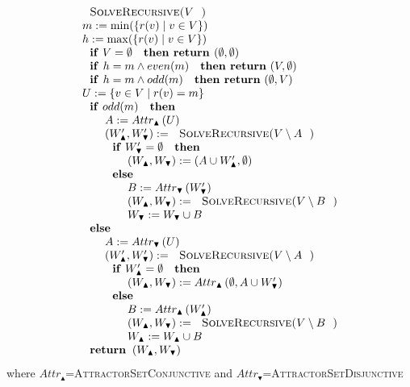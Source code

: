 \begin{equation*}
\begin{array}{l}
\text{\textsc{SolveRecursive(}}V\text{\textsc{)}} \\ 
m:=\min (\{r(v)\mid v\in V\}) \\ 
h:=\max (\{r(v)\mid v\in V\}) \\ 
\text{\textbf{if} }V=\emptyset \text{ \textbf{then return }}(\emptyset
,\emptyset ) \\ 
\text{\textbf{if }}h=m\wedge even(m)\text{ \textbf{then return} }%
(V,\emptyset ) \\ 
\text{\textbf{if }}h=m\wedge odd(m)\text{ \textbf{then return} }(\emptyset
,V) \\ 
U:=\{v\in V\mid r(v)=m\} \\ 
\text{\textbf{if} }odd(m)\text{ \textbf{then}} \\ 
\qquad A:=Attr_{\blacktriangle }\left( U\right)  \\ 
\qquad \left( W_{\blacktriangle }^{\prime },W_{\blacktriangledown }^{\prime
}\right) :=\text{\textsc{SolveRecursive(}}V\setminus A\text{)} \\ 
\qquad \text{\textbf{if} }W_{\blacktriangledown }^{\prime }=\emptyset \text{ 
\textbf{then}} \\ 
\qquad \qquad \left( W_{\blacktriangle },W_{\blacktriangledown }\right)
:=\left( A\cup W_{\blacktriangle }^{\prime },\emptyset \right)  \\ 
\qquad \text{\textbf{else}} \\ 
\qquad \qquad B:=Attr_{\blacktriangledown }\left( W_{\blacktriangledown
}^{\prime }\right)  \\ 
\qquad \qquad \left( W_{\blacktriangle },W_{\blacktriangledown }\right) :=%
\text{\textsc{SolveRecursive(}}V\setminus B\text{)} \\ 
\qquad \qquad W_{\blacktriangledown }:=W_{\blacktriangledown }\cup B \\ 
\text{\textbf{else}} \\ 
\qquad A:=Attr_{\blacktriangledown }\left( U\right)  \\ 
\qquad \left( W_{\blacktriangle }^{\prime },W_{\blacktriangledown }^{\prime
}\right) :=\text{\textsc{SolveRecursive(}}V\setminus A\text{)} \\ 
\qquad \text{\textbf{if} }W_{\blacktriangle }^{\prime }=\emptyset \text{ 
\textbf{then}} \\ 
\qquad \qquad \left( W_{\blacktriangle },W_{\blacktriangledown }\right)
:=Attr_{\blacktriangle }\left( \emptyset ,A\cup W_{\blacktriangledown
}^{\prime }\right)  \\ 
\qquad \text{\textbf{else}} \\ 
\qquad \qquad B:=Attr_{\blacktriangle }\left( W_{\blacktriangle }^{\prime
}\right)  \\ 
\qquad \qquad \left( W_{\blacktriangle },W_{\blacktriangledown }\right) :=%
\text{\textsc{SolveRecursive(}}V\setminus B\text{)} \\ 
\qquad \qquad W_{\blacktriangle }:=W_{\blacktriangle }\cup B \\ 
\text{\textbf{return }}\left( W_{\blacktriangle },W_{\blacktriangledown
}\right) 
\end{array}%
\end{equation*}%
where $Attr_{\blacktriangle }$=\textsc{AttractorSetConjunctive} and $%
Attr_{\blacktriangledown }$=\textsc{AttractorSetDisjunctive}

\newpage
